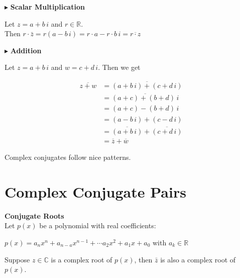 \documentclass{ximera}
\begin{document}
$\blacktriangleright$ \textbf{Scalar Multiplication}


Let $z = a + b \, i$  and $r \in \mathbb{R}$. \\

Then $r \cdot \bar{z} = r(a - b \, i) = r \cdot a - r \cdot b \, i = \overline{r \cdot z}$







$\blacktriangleright$ \textbf{Addition}


Let $z = a + b \, i$ and $w = c + d \, i$.  Then we get


\begin{align*}
\overline{z + w} & = \overline{(a + b \, i) + (c + d \, i)}  \\
                & = \overline{(a + c) + (b + d) \, i}   \\
                & = (a + c) - (b + d) \, i  \\
                & = (a - b \, i) + (c - d \, i)   \\
                & = \overline{(a + b \, i)} + \overline{(c + d \, i)}  \\
                & = \overline{z} + \overline{w}
\end{align*}





Complex conjugates follow nice patterns. 

















\section{Complex Conjugate Pairs}




\begin{theorem} \textbf{\textcolor{blue!55!black}{Conjugate Roots}}   \\



Let $p(x)$ be a polynomial with real coefficients:

$p(x) = a_n x^n + a_{n-a} x^{n-1} + \cdots a_2 x^2 + a_1 x + a_0$   with $a_k \in \mathbb{R}$

Suppose $z \in \mathbb{C}$ is a complex root of $p(x)$, then $\bar{z}$ is also a complex root of $p(x)$.


\end{theorem}
\end{document}
